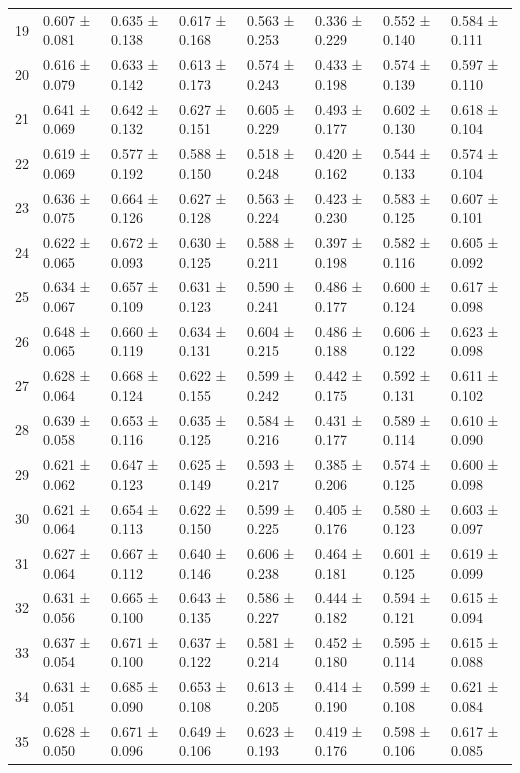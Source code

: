 \begin{tabular}{llllllll}
19 & 0.607 ± 0.081 & 0.635 ± 0.138 & 0.617 ± 0.168 & 0.563 ± 0.253 & 0.336 ± 0.229 & 0.552 ± 0.140 & 0.584 ± 0.111 \\
20 & 0.616 ± 0.079 & 0.633 ± 0.142 & 0.613 ± 0.173 & 0.574 ± 0.243 & 0.433 ± 0.198 & 0.574 ± 0.139 & 0.597 ± 0.110 \\
21 & 0.641 ± 0.069 & 0.642 ± 0.132 & 0.627 ± 0.151 & 0.605 ± 0.229 & 0.493 ± 0.177 & 0.602 ± 0.130 & 0.618 ± 0.104 \\
22 & 0.619 ± 0.069 & 0.577 ± 0.192 & 0.588 ± 0.150 & 0.518 ± 0.248 & 0.420 ± 0.162 & 0.544 ± 0.133 & 0.574 ± 0.104 \\
23 & 0.636 ± 0.075 & 0.664 ± 0.126 & 0.627 ± 0.128 & 0.563 ± 0.224 & 0.423 ± 0.230 & 0.583 ± 0.125 & 0.607 ± 0.101 \\
24 & 0.622 ± 0.065 & 0.672 ± 0.093 & 0.630 ± 0.125 & 0.588 ± 0.211 & 0.397 ± 0.198 & 0.582 ± 0.116 & 0.605 ± 0.092 \\
25 & 0.634 ± 0.067 & 0.657 ± 0.109 & 0.631 ± 0.123 & 0.590 ± 0.241 & 0.486 ± 0.177 & 0.600 ± 0.124 & 0.617 ± 0.098 \\
26 & 0.648 ± 0.065 & 0.660 ± 0.119 & 0.634 ± 0.131 & 0.604 ± 0.215 & 0.486 ± 0.188 & 0.606 ± 0.122 & 0.623 ± 0.098 \\
27 & 0.628 ± 0.064 & 0.668 ± 0.124 & 0.622 ± 0.155 & 0.599 ± 0.242 & 0.442 ± 0.175 & 0.592 ± 0.131 & 0.611 ± 0.102 \\
28 & 0.639 ± 0.058 & 0.653 ± 0.116 & 0.635 ± 0.125 & 0.584 ± 0.216 & 0.431 ± 0.177 & 0.589 ± 0.114 & 0.610 ± 0.090 \\
29 & 0.621 ± 0.062 & 0.647 ± 0.123 & 0.625 ± 0.149 & 0.593 ± 0.217 & 0.385 ± 0.206 & 0.574 ± 0.125 & 0.600 ± 0.098 \\
30 & 0.621 ± 0.064 & 0.654 ± 0.113 & 0.622 ± 0.150 & 0.599 ± 0.225 & 0.405 ± 0.176 & 0.580 ± 0.123 & 0.603 ± 0.097 \\
31 & 0.627 ± 0.064 & 0.667 ± 0.112 & 0.640 ± 0.146 & 0.606 ± 0.238 & 0.464 ± 0.181 & 0.601 ± 0.125 & 0.619 ± 0.099 \\
32 & 0.631 ± 0.056 & 0.665 ± 0.100 & 0.643 ± 0.135 & 0.586 ± 0.227 & 0.444 ± 0.182 & 0.594 ± 0.121 & 0.615 ± 0.094 \\
33 & 0.637 ± 0.054 & 0.671 ± 0.100 & 0.637 ± 0.122 & 0.581 ± 0.214 & 0.452 ± 0.180 & 0.595 ± 0.114 & 0.615 ± 0.088 \\
34 & 0.631 ± 0.051 & 0.685 ± 0.090 & 0.653 ± 0.108 & 0.613 ± 0.205 & 0.414 ± 0.190 & 0.599 ± 0.108 & 0.621 ± 0.084 \\
35 & 0.628 ± 0.050 & 0.671 ± 0.096 & 0.649 ± 0.106 & 0.623 ± 0.193 & 0.419 ± 0.176 & 0.598 ± 0.106 & 0.617 ± 0.085 \\

\end{tabular}
